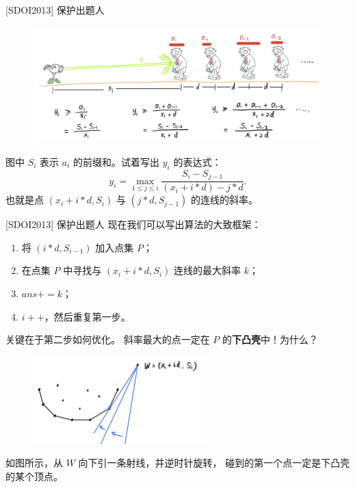\documentclass{beamer}
\begin{document}
\begin{frame}{[SDOI2013] 保护出题人}
    \footnotesize
    \begin{figure}[H]
        \centering
        \includegraphics[width=\textwidth]{pic/sdoi2013.jpg}
    \end{figure}
    图中 $S_i$ 表示 $a_i$ 的前缀和。试着写出 $y_i$ 的表达式：
    \pause
    \begin{equation}
        y_i=\max_{1\leq j\leq i} \frac{S_i-S_{j-1}}{(x_i+i*d)-j*d}.
    \end{equation}
    也就是点 $(x_i+i*d,S_i)$ 与 $(j*d,S_{j-1})$ 的连线的斜率。
\end{frame}

\begin{frame}{[SDOI2013] 保护出题人}
    \footnotesize
    现在我们可以写出算法的大致框架：

    \begin{enumerate}
        \item 将 $(i*d, S_{i-1})$ 加入点集 $P$；
        \item 在点集 $P$ 中寻找与 $(x_i+i*d,S_i)$ 连线的最大斜率 $k$；
        \item $ans+=k$；
        \item $i++$，然后重复第一步。
    \end{enumerate}

    关键在于第二步如何优化。
    \pause
    斜率最大的点一定在 $P$ 的\textbf{下凸壳}中！为什么？
    \pause
    \begin{figure}[H]
        \centering
        \includegraphics[width=0.6\textwidth]{pic/sdoi2013-2.jpg}
    \end{figure}
    如图所示，从 $W$ 向下引一条射线，并逆时针旋转，
    碰到的第一个点一定是下凸壳的某个顶点。
\end{frame}
\end{document}
